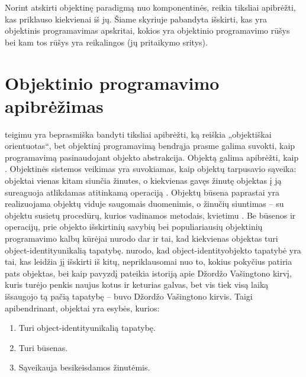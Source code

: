 
Norint atskirti objektinę paradigmą nuo komponentinės, reikia
tiksliai apibrėžti, kas priklauso kiekvienai iš jų.
Šiame skyriuje pabandyta išskirti, kas yra objektinis programavimas
apskritai, kokios yra objektinio programavimo rūšys bei kam
tos rūšys yra reikalingos (jų pritaikymo sritys).


\section{Objektinio programavimo apibrėžimas}

\cite[225]{types-and-programming-languages} teigimu yra beprasmiška
bandyti tiksliai apibrėžti, ką reiškia „objektiškai orientuotas“,
bet objektinį programavimą bendrąja prasme galima suvokti, kaip
programavimą pasinaudojant objekto abstrakcija. Objektą galima
apibrėžti, kaip 
\cite[41]{OOP-themes-and-variations}.  Objektinės sistemos veikimas
yra suvokiamas, kaip objektų tarpusavio sąveika: objektai vienas kitam
siunčia žinutes, o kiekvienas gavęs žinutę objektas į ją sureaguoja
atlikdamas atitinkamą operaciją
\cites[41]{OOP-themes-and-variations}%
[277]{concepts-in-programming-languages}%
[168]{Wegner:1987:DOL:38807.38823}.
Objektų būsena paprastai yra realizuojama objektų viduje saugomais
duomenimis, o žinučių siuntimas – su objektu susietų procedūrų,
kurios vadinamos metodais, kvietimu \cite[41]{OOP-themes-and-variations}.
Be būsenos ir operacijų, prie objekto išskirtinių savybių
\cite[37]{cs-beyond-object-oriented-programming} bei populiariausių
objektinių programavimo kalbų kūrėjai nurodo dar ir tai, kad
kiekvienas objektas turi \gls{object-identity}{unikalią tapatybę}.
\cite[37]{cs-beyond-object-oriented-programming} nurodo,
kad \gls{object-identity}{objekto tapatybė} yra tai, kas leidžia jį
išskirti iš kitų, nepriklausomai nuo to, kokius pokyčius patiria pats
objektas, bei kaip pavyzdį pateikia istoriją apie Džordžo Vašingtono
kirvį, kuris turėjo penkis naujus kotus ir keturias galvas, bet vis
tiek visą laiką išsaugojo tą pačią tapatybę – buvo Džordžo
Vašingtono kirvis. Taigi apibendrinant, objektai yra esybės, kurios:
\begin{enumerate}
  \item Turi \gls{object-identity}{unikalią tapatybę}.
  \item Turi būsenas.
  \item Sąveikauja besikeisdamos žinutėmis.
\end{enumerate}

